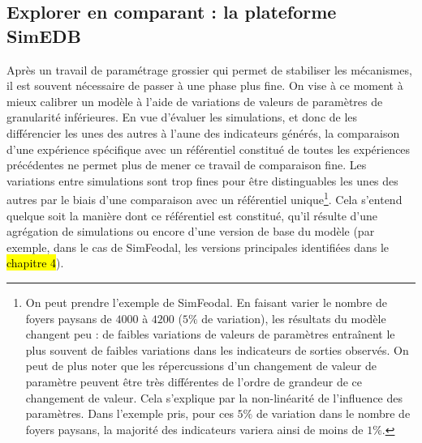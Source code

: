 \subsection[Explorer en comparant : la plateforme SimEDB]{Explorer en comparant : la plateforme SimEDB\footnotemark}\label{subsec:explorer-simedb}
Après un travail de paramétrage grossier qui permet de stabiliser les mécanismes, il est souvent nécessaire de passer à une phase plus fine.
On vise à ce moment à mieux calibrer un modèle à l'aide de variations de valeurs de paramètres de granularité inférieures.
En vue d'évaluer les simulations, et donc de les différencier les unes des autres à l'aune des indicateurs générés, la comparaison d'une expérience spécifique avec un référentiel constitué de toutes les expériences précédentes ne permet plus de mener ce travail de comparaison fine.
Les variations entre simulations sont trop fines pour être distinguables les unes des autres par le biais d'une comparaison avec un référentiel unique\footnote{
	On peut prendre l'exemple de SimFeodal.
	En faisant varier le nombre de foyers paysans de $4000$ à $4200$ ($5\%$ de variation), les résultats du modèle changent peu : de faibles variations de valeurs de paramètres entraînent le plus souvent de faibles variations dans les indicateurs de sorties observés.
	On peut de plus noter que les répercussions d'un changement de valeur de paramètre peuvent être très différentes de l'ordre de grandeur de ce changement de valeur.
	Cela s'explique par la non-linéarité de l'influence des paramètres.
	Dans l'exemple pris, pour ces $5\%$ de variation dans le nombre de foyers paysans, la majorité des indicateurs variera ainsi de moins de $1\%$.
}.
Cela s'entend quelque soit la manière dont ce référentiel est constitué, qu'il résulte d'une agrégation de simulations ou encore d'une version \og de base\fg{} du modèle (par exemple, dans le cas de SimFeodal, les versions principales identifiées dans le \hl{chapitre 4}).


